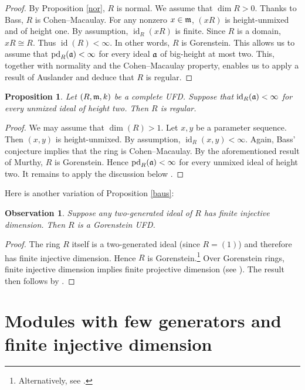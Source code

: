 \documentclass[10. pt,a4paper]{amsart}
\newtheorem{proposition}[theorem]{Proposition}
\newtheorem{observation}[theorem]{Observation}
\theoremstyle{definition}
\theoremstyle{remark}
\newcommand{\id}{\operatorname{id}}
\newcommand{\pd}{\operatorname{pd}}
\newcommand{\fm}{\frak{m}}
\newcommand{\fa}{\frak{a}}
\begin{document}
\begin{proof}
	By Proposition \ref{nor}, $R$ is normal. We assume that $\dim R>0$. Thanks to Bass, $R$ is Cohen--Macaulay. 
	For any nonzero $x\in\fm$, $(xR)$ is height-unmixed and of height one. By assumption, $\id_R(xR)$ is finite. Since $R$ is a domain, $xR\cong R$. Thus $\id(R)<\infty$. In other words, $R$ is Gorenstein. This allows us to assume that $\pd_R(\fa)<\infty$ for every ideal $\fa$ of big-height at most two. This, together with normality and the Cohen--Macaulay property, enables us to apply a result of Auslander \cite[Corollary 5]{baus} and deduce that $R$ is regular.
\end{proof}

\begin{proposition}
	Let $(R,\fm,k)$ be a complete UFD. Suppose that $\id_R(\fa)<\infty$ for every unmixed ideal of height two. Then $R$ is regular.
\end{proposition}

\begin{proof}
	We may assume that $\dim(R)>1$. Let $x,y$ be a parameter sequence. Then $(x,y)$ is height-unmixed. By assumption, $\id_R(x,y)<\infty$. Again, Bass'  conjecture implies that the ring is Cohen--Macaulay. By the aforementioned result of Murthy, $R$ is Gorenstein. Hence $\pd_R(\fa)<\infty$ for every unmixed ideal of height two. It remains to apply the discussion below \cite[Corollary 5]{baus}.
\end{proof}
Here is another variation of Proposition \ref{baus}:

\begin{observation}
	Suppose any two-generated ideal of $R$ has finite injective dimension. Then $R$ is a Gorenstein UFD.
\end{observation}

\begin{proof}
	The ring $R$ itself is a two-generated ideal (since $R = (1)$) and therefore has finite injective dimension. Hence $R$ is Gorenstein.\footnote{Alternatively, see \cite[II.5.5]{PS}.}
	Over Gorenstein rings, finite injective dimension implies finite projective dimension (see \cite[3.1.25]{BH}). The result then follows by \cite[5.3]{BE}.
\end{proof}


\section{Modules with few generators and finite injective dimension}
\end{document}
